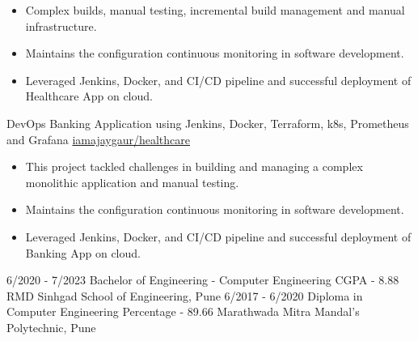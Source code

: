 \documentclass[9pt]{developercv} %
\begin{document}
\begin{entrylist}
		{
                \begin{itemize}[noitemsep,topsep=0pt,parsep=0pt,partopsep=0pt, leftmargin=0pt]
                    \item Complex builds, manual testing, incremental build management and manual infrastructure.
                    \item Maintains the configuration continuous monitoring in software development.
                    \item Leveraged Jenkins, Docker, and CI/CD pipeline and successful deployment of Healthcare App on cloud.
                \end{itemize}
            }
    \entry
		{DevOps}
		{Banking Application using Jenkins, Docker, Terraform, k8s, Prometheus and Grafana \vspace{-8 pt}}
		{\href{https://github.com/iamajaygaur/healthcare.git}{iamajaygaur/healthcare}}
		{
                \begin{itemize}[noitemsep,topsep=0pt,parsep=0pt,partopsep=0pt, leftmargin=0pt]
                    \item This project tackled challenges in building and managing a complex monolithic application and manual testing.
                    \item Maintains the configuration continuous monitoring in software development.
                    \item Leveraged Jenkins, Docker, and CI/CD pipeline and successful deployment of Banking App on cloud.
                \end{itemize}
            }
\end{entrylist}

\vspace{-10 pt}
\begin{entrylist}
    \entry
		{6/2020 - 7/2023}
		{Bachelor of Engineering - Computer Engineering}
		{CGPA - 8.88}
		{RMD Sinhgad School of Engineering, Pune}
    \entry
		{6/2017 - 6/2020}
		{Diploma in Computer Engineering}
		{Percentage - 89.66}
        {Marathwada Mitra Mandal’s Polytechnic, Pune}
\end{entrylist}
\end{document}
